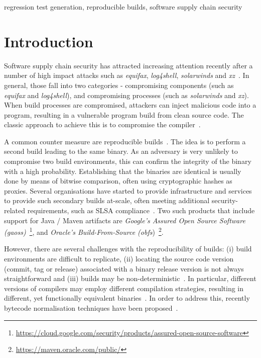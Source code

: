 \documentclass[conference]{IEEEtran}
\begin{document}
\begin{IEEEkeywords}
regression test generation, reproducible builds, software supply chain security
\end{IEEEkeywords}

\section{Introduction}

Software supply chain security has attracted increasing attention recently after a number of high impact attacks such as \textit{equifax}, \textit{log4shell}, \textit{solarwinds} and \textit{xz}~\cite{ellison2010evaluating,martinez2021software,enck2022top,EO14028}. In general, those fall into two categories - compromising components (such as \textit{equifax} and \textit{log4shell}), and compromising processes (such as \textit{solarwinds} and \textit{xz}). When build processes are compromised, attackers can inject malicious code into a program, resulting in a vulnerable program build from clean source code. The classic approach to achieve this is to compromise the compiler~\cite{thompson1984reflections}. 

A common counter measure are reproducible builds~\cite{reproduciblebuild, lamb2021reproducible}. The idea is to perform a second build leading to the same binary. As an adversary is very unlikely to compromise two build environments, this can confirm the integrity of the binary with a high probability. Establishing that the binaries are identical is usually done by means of bitwise comparison, often using cryptographic hashes as proxies.
Several organisations have started to provide infrastructure and services to provide such secondary builds at-scale, often meeting additional security-related requirements, such as SLSA compliance~\cite{slsa}. Two such products that include support for Java / Maven artifacts are \textit{Google's Assured Open Source Software (gaoss)}~\footnote{\url{https://cloud.google.com/security/products/assured-open-source-software}}, and \textit{Oracle's Build-From-Source (obfs})~\footnote{\url{https://maven.oracle.com/public/}}.

However, there are several challenges with the reproducibility of builds: (i) build environments are difficult to replicate, (ii) locating the source code version (commit, tag or release) associated with a binary release version is not always straightforward and (iii) builds may be non-deterministic~\cite{xiong2022towards,hassanshahi2023macaron,bineqdataset,keshani2024aroma}. In particular, different versions of compilers may employ different compilation strategies, resulting in different, yet functionally equivalent binaries~\cite{xiong2022towards,bineqdataset,schott2024JNorm}.  
In order to address this, recently bytecode normalisation techniques have been proposed~\cite{xiong2022towards,dietrich2024levelsbinaryequivalencecomparison,schott2024JNorm}. 
\end{document}
